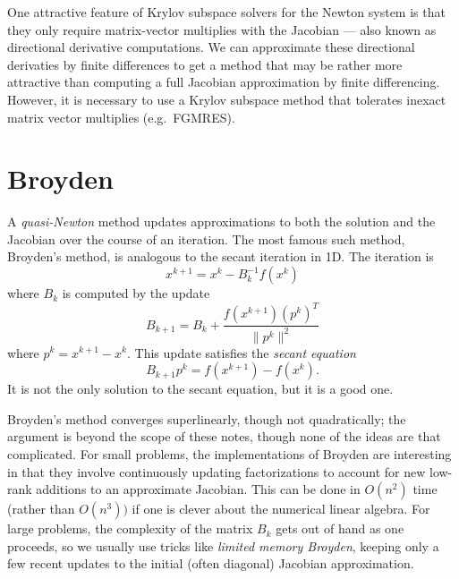 \documentclass[12pt, leqno]{article} %
\begin{document}
One attractive feature of Krylov subspace solvers for the Newton
system is that they only require matrix-vector multiplies with
the Jacobian --- also known as directional derivative computations.
We can approximate these directional derivaties by finite differences
to get a method that may be rather more attractive than computing
a full Jacobian approximation by finite differencing.  However,
it is necessary to use a Krylov subspace method that tolerates inexact
matrix vector multiplies (e.g.~FGMRES).

\section*{Broyden}

A {\em quasi-Newton} method updates approximations to both the
solution and the Jacobian over the course of an iteration.  The
most famous such method, Broyden's method, is analogous to the secant
iteration in 1D.  The iteration is
\[
  x^{k+1} = x^k - B_k^{-1} f(x^k)
\]
where $B_k$ is computed by the update
\[
  B_{k+1} = B_k + \frac{f(x^{k+1}) (p^k)^T}{\|p^k\|^2}
\]
where $p^k = x^{k+1}-x^k$.  This update satisfies the {\em secant equation}
\[
  B_{k+1} p^k = f(x^{k+1})-f(x^k).  
\]
It is not the only solution to the secant equation, but it is a good
one.

Broyden's method converges superlinearly, though not quadratically;
the argument is beyond the scope of these notes, though none of the
ideas are that complicated.  For small problems, the implementations
of Broyden are interesting in that they involve continuously updating
factorizations to account for new low-rank additions to an approximate
Jacobian.  This can be done in $O(n^2)$ time (rather than $O(n^3))$ if
one is clever about the numerical linear algebra.  For large problems,
the complexity of the matrix $B_k$ gets out of hand as one proceeds,
so we usually use tricks like {\em limited memory Broyden}, keeping
only a few recent updates to the initial (often diagonal) Jacobian
approximation.
\end{document}

